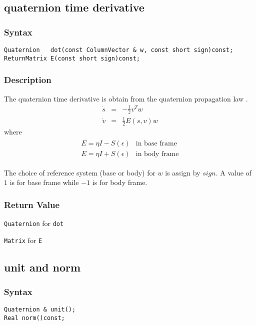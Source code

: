 \documentclass[11pt,fleqn,letterpaper]{report}
\newcommand{\mbold}[1]{\mbox{\boldmath $ #1 $}}
\begin{document}
\subsection*{quaternion time derivative}

\subsubsection*{Syntax}
\begin{verbatim}
Quaternion   dot(const ColumnVector & w, const short sign)const;
ReturnMatrix E(const short sign)const; 
\end{verbatim}
\subsubsection{Description}
The quaternion time derivative is obtain from the quaternion
propagation law \cite{Dam98}.
\begin{eqnarray}
 \dot{s} &=& -\frac{1}{2}v^Tw \\
 \dot{v} &=& \frac{1}{2}E(s,v)w 
\end{eqnarray}
where
\begin{eqnarray}
 \begin{array}{cc}
   E = \eta I - S(\epsilon) & \textrm{in base frame} \\
   E = \eta I + S(\epsilon) & \textrm{in body frame}
  \end{array}
\end{eqnarray}

\noindent
The choice of reference system (base or body) for \mbold{w} is assign
by \mbold{sign}. A value of $1$ is for base frame while $-1$ is for
body frame.

\subsubsection*{Return Value}

{\tt Quaternion} for \texttt{dot}

\noindent \texttt{Matrix} for \texttt{E}

\newpage

\subsection*{unit and norm}

\subsubsection*{Syntax}
\begin{verbatim}
Quaternion & unit();
Real norm()const;
\end{verbatim}
\end{document}
